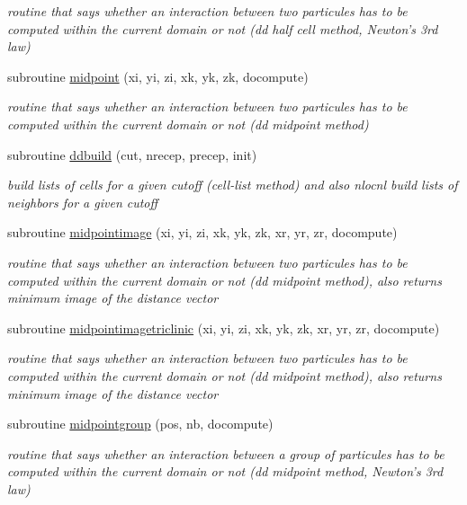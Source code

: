 \begin{DoxyCompactItemize}
\begin{DoxyCompactList}\small\item\em routine that says whether an interaction between two particules has to be computed within the current domain or not (dd half cell method, Newton's 3rd law) \end{DoxyCompactList}\item 
subroutine \hyperlink{domdecstuff_8f90_ad6637fa81fdeee14641ef4b130e4c2fb}{midpoint} (xi, yi, zi, xk, yk, zk, docompute)
\begin{DoxyCompactList}\small\item\em routine that says whether an interaction between two particules has to be computed within the current domain or not (dd midpoint method) \end{DoxyCompactList}\item 
subroutine \hyperlink{domdecstuff_8f90_abfb09818a0d039af1191ef6f01d072dd}{ddbuild} (cut, nrecep, precep, init)
\begin{DoxyCompactList}\small\item\em build lists of cells for a given cutoff (cell-\/list method) and also nlocnl build lists of neighbors for a given cutoff \end{DoxyCompactList}\item 
subroutine \hyperlink{domdecstuff_8f90_aea7b5c162ab0b349208e09aba98c022e}{midpointimage} (xi, yi, zi, xk, yk, zk, xr, yr, zr, docompute)
\begin{DoxyCompactList}\small\item\em routine that says whether an interaction between two particules has to be computed within the current domain or not (dd midpoint method), also returns minimum image of the distance vector \end{DoxyCompactList}\item 
subroutine \hyperlink{domdecstuff_8f90_aa4bbdfb87b938140e0237028b1d76457}{midpointimagetriclinic} (xi, yi, zi, xk, yk, zk, xr, yr, zr, docompute)
\begin{DoxyCompactList}\small\item\em routine that says whether an interaction between two particules has to be computed within the current domain or not (dd midpoint method), also returns minimum image of the distance vector \end{DoxyCompactList}\item 
subroutine \hyperlink{domdecstuff_8f90_a62803650b9f49aab84f4be179de1cb7e}{midpointgroup} (pos, nb, docompute)
\begin{DoxyCompactList}\small\item\em routine that says whether an interaction between a group of particules has to be computed within the current domain or not (dd midpoint method, Newton's 3rd law) \end{DoxyCompactList}\item 

\end{DoxyCompactItemize}
